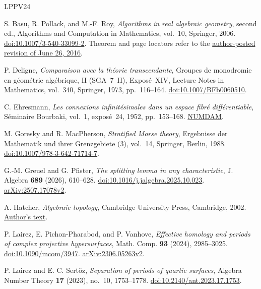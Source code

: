 \begin{thebibliography}{LPPV24}

S. Basu, R. Pollack, and M.-F. Roy,
\emph{Algorithms in real algebraic geometry}, second ed.,
Algorithms and Computation in Mathematics, vol.~10, Springer, 2006.
\href{https://doi.org/10.1007/3-540-33099-2}{doi:10.1007/3-540-33099-2}.
Theorem and page locators refer to the
\href{https://mariefrancoiseroy.pages.math.cnrs.fr/bpr-ed2-posted3.pdf}
{author-posted revision of June 26, 2016}.

P. Deligne, \emph{Comparaison avec la th\'eorie transcendante},
Groupes de monodromie en g\'eom\'etrie alg\'ebrique, II (SGA~7~II),
Expos\'e~XIV, Lecture Notes in Mathematics, vol.~340,
Springer, 1973, pp.~116--164.
\href{https://doi.org/10.1007/BFb0060510}{doi:10.1007/BFb0060510}.

C. Ehresmann, \emph{Les connexions infinit\'esimales dans un espace
fibr\'e diff\'erentiable}, S\'eminaire Bourbaki, vol.~1, expos\'e~24,
1952, pp.~153--168.
\href{https://www.numdam.org/item/SB_1948-1951__1__153_0/}{NUMDAM}.

M. Goresky and R. MacPherson,
\emph{Stratified Morse theory}, Ergebnisse der Mathematik und ihrer
Grenzgebiete (3), vol.~14, Springer, Berlin, 1988.
\href{https://doi.org/10.1007/978-3-642-71714-7}
{doi:10.1007/978-3-642-71714-7}.

G.-M. Greuel and G. Pfister, \emph{The splitting lemma in any characteristic},
J. Algebra \textbf{689} (2026), 610--628.
\href{https://doi.org/10.1016/j.jalgebra.2025.10.023}
{doi:10.1016/j.jalgebra.2025.10.023}.
\href{https://arxiv.org/abs/2507.17078v2}{arXiv:2507.17078v2}.

A. Hatcher, \emph{Algebraic topology}, Cambridge University Press,
Cambridge, 2002.
\href{https://pi.math.cornell.edu/~hatcher/AT/AT.pdf}{Author's text}.

P. Lairez, E. Pichon-Pharabod, and P. Vanhove,
\emph{Effective homology and periods of complex projective hypersurfaces},
Math. Comp. \textbf{93} (2024), 2985--3025.
\href{https://doi.org/10.1090/mcom/3947}{doi:10.1090/mcom/3947}.
\href{https://arxiv.org/abs/2306.05263v2}{arXiv:2306.05263v2}.

P. Lairez and E. C. Sert\"oz,
\emph{Separation of periods of quartic surfaces},
Algebra Number Theory \textbf{17} (2023), no.~10, 1753--1778.
\href{https://doi.org/10.2140/ant.2023.17.1753}
{doi:10.2140/ant.2023.17.1753}.


\end{thebibliography}
